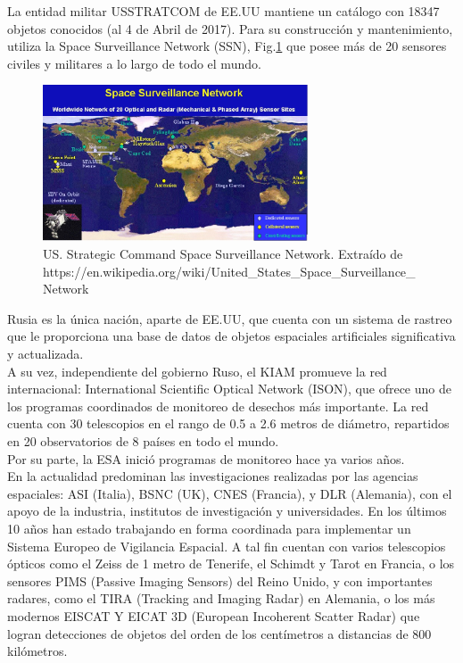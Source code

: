 La entidad militar \ac{USSTRATCOM} de EE.UU mantiene un catálogo con 18347 objetos conocidos (al 4 de Abril de 2017). Para su construcci\'on y mantenimiento, utiliza la Space Surveillance Network (SSN), Fig.\ref{fig:usnet}  que posee m\'as de 20 sensores civiles y militares a lo largo de todo el mundo.\\

\begin{figure}[!h]
  \centering
  \includegraphics[width=0.7\textwidth]{imagenes/SpSNet}
  \caption[USSTRATCOM - SSN]{US. Strategic Command Space Surveillance Network. Extra\'ido de https://en.wikipedia.org/wiki/United\_States\_Space\_Surveillance\_Network}
  \label{fig:usnet}
\end{figure}

Rusia es la \'unica naci\'on, aparte de EE.UU, que cuenta con un sistema de rastreo que le proporciona una base de datos de objetos espaciales artificiales significativa y actualizada.\\
A su vez, independiente del gobierno Ruso, el KIAM promueve la red internacional: International Scientific Optical Network (ISON), que ofrece uno de los programas coordinados de monitoreo de desechos m\'as importante.
La red cuenta con 30 telescopios en el rango de 0.5 a 2.6 metros de di\'ametro, repartidos en 20 observatorios de 8 pa\'ises en todo el mundo.\\

Por su parte, la ESA inici\'o programas de monitoreo hace ya varios a\~nos.\\
En la actualidad predominan las investigaciones realizadas por las agencias espaciales: ASI (Italia), BSNC (UK), CNES (Francia), y DLR (Alemania), con el apoyo de la industria, institutos de investigaci\'on y universidades. En los \'ultimos 10 a\~nos han estado trabajando en forma coordinada para implementar un Sistema Europeo de Vigilancia Espacial.
A tal fin cuentan con varios telescopios \'opticos como el Zeiss de 1 metro de Tenerife, el Schimdt y Tarot en Francia, o los sensores PIMS (Passive Imaging Sensors) del Reino Unido, y con importantes radares, como el TIRA (Tracking and Imaging Radar) en Alemania, o los m\'as modernos EISCAT Y EICAT 3D (European Incoherent Scatter Radar) que logran detecciones de objetos del orden de los cent\'imetros a distancias de 800 kil\'ometros.


